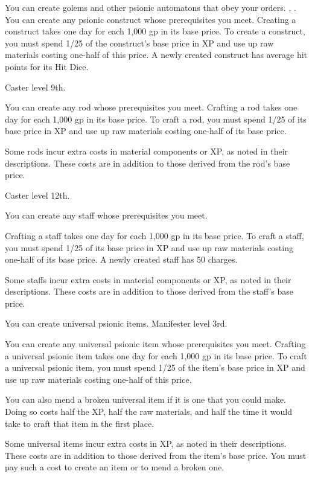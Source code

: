 {You can create golems and other psionic automatons that obey your orders.}
{, .}
{You can create any psionic construct whose prerequisites you meet. Creating a construct takes one day for each 1,000 gp in its base price. To create a construct, you must spend 1/25 of the construct's base price in XP and use up raw materials costing one-half of this price. A newly created construct has average hit points for its Hit Dice.}{}{}

{Caster level 9th.}
{You can create any rod whose prerequisites you meet. Crafting a rod takes one day for each 1,000 gp in its base price. To craft a rod, you must spend 1/25 of its base price in XP and use up raw materials costing one-half of its base price.

Some rods incur extra costs in material components or XP, as noted in their descriptions. These costs are in addition to those derived from the rod's base price.}

{Caster level 12th.}
{You can create any staff whose prerequisites you meet.

Crafting a staff takes one day for each 1,000 gp in its base price. To craft a staff, you must spend 1/25 of its base price in XP and use up raw materials costing one-half of its base price. A newly created staff has 50 charges.

Some staffs incur extra costs in material components or XP, as noted in their descriptions. These costs are in addition to those derived from the staff's base price.}

{You can create universal psionic items.}
{Manifester level 3rd.}
{You can create any universal psionic item whose prerequisites you meet. Crafting a universal psionic item takes one day for each 1,000 gp in its base price. To craft a universal psionic item, you must spend 1/25 of the item's base price in XP and use up raw materials costing one-half of this price.

You can also mend a broken universal item if it is one that you could make. Doing so costs half the XP, half the raw materials, and half the time it would take to craft that item in the first place.

Some universal items incur extra costs in XP, as noted in their descriptions. These costs are in addition to those derived from the item's base price. You must pay such a cost to create an item or to mend a broken one.}{}{}

